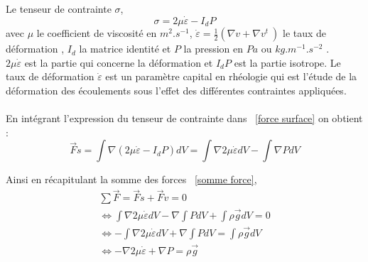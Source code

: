 \documentclass{article}
\begin{document}
Le tenseur de contrainte $\sigma$,
\begin{equation}
\sigma = 2 \mu \dot \varepsilon - I_{d}P
\end{equation}
avec $\mu$ le coefficient de viscosité en $m^{2}.s^{-1}$, $\dot \varepsilon = \frac{1}{2}( \nabla v + \nabla v^t\ ) $ le taux de déformation , $I_{d}$ la matrice identité et $P$ la pression en $Pa$ ou $kg.m^{-1}.s^{-2}$ .   \\ 
$2\mu \dot \varepsilon$ est la partie qui concerne la déformation et $I_{d}P$ est la partie isotrope. Le taux de déformation $\dot \varepsilon$ est un paramètre capital en rhéologie qui est l'étude de la déformation des écoulements sous l'effet des différentes contraintes appliquées.
\\\\
En intégrant l'expression du tenseur de contrainte dans ~\eqref{force surface} on obtient :
\begin{equation}
\vec{F}s = \int \nabla(2 \mu \dot \varepsilon - I_{d}P ) dV =  \int \nabla 2 \mu \dot \varepsilon dV - \int \nabla P dV
\end{equation}


Ainsi en récapitulant la somme des forces ~\eqref{somme force},
\begin{equation}
\begin{split}
\sum\vec{F} = \vec{F}s + \vec{F}v = 0 \\
\Leftrightarrow 
\int \nabla 2 \mu \dot \varepsilon dV - \nabla \int P dV + \int \rho \vec{g} dV = 0 \\
\Leftrightarrow 
- \int \nabla 2 \mu \dot \varepsilon dV + \nabla \int P dV = \int \rho \vec{g} dV  \\
\Leftrightarrow 
- \nabla 2 \mu \dot \varepsilon + \nabla P = \rho \vec{g}
\end{split}
\end{equation}
\end{document}

